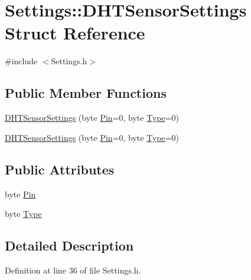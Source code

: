 \hypertarget{struct_settings_1_1_d_h_t_sensor_settings}{}\section{Settings\+:\+:D\+H\+T\+Sensor\+Settings Struct Reference}
\label{struct_settings_1_1_d_h_t_sensor_settings}


{\ttfamily \#include $<$Settings.\+h$>$}

\subsection*{Public Member Functions}
\begin{DoxyCompactItemize}
\item 
\hyperlink{struct_settings_1_1_d_h_t_sensor_settings_a9a3d8febe76e4cc665a25b3c7b5c847f}{D\+H\+T\+Sensor\+Settings} (byte \hyperlink{struct_settings_1_1_d_h_t_sensor_settings_a7ddbf39f8aa365c0282e4391219473be}{Pin}=0, byte \hyperlink{struct_settings_1_1_d_h_t_sensor_settings_af7ba74c5a9f4875c6e2154e631d67ea8}{Type}=0)
\item 
\hyperlink{struct_settings_1_1_d_h_t_sensor_settings_a9a3d8febe76e4cc665a25b3c7b5c847f}{D\+H\+T\+Sensor\+Settings} (byte \hyperlink{struct_settings_1_1_d_h_t_sensor_settings_a7ddbf39f8aa365c0282e4391219473be}{Pin}=0, byte \hyperlink{struct_settings_1_1_d_h_t_sensor_settings_af7ba74c5a9f4875c6e2154e631d67ea8}{Type}=0)
\end{DoxyCompactItemize}
\subsection*{Public Attributes}
\begin{DoxyCompactItemize}
\item 
byte \hyperlink{struct_settings_1_1_d_h_t_sensor_settings_a7ddbf39f8aa365c0282e4391219473be}{Pin}
\item 
byte \hyperlink{struct_settings_1_1_d_h_t_sensor_settings_af7ba74c5a9f4875c6e2154e631d67ea8}{Type}
\end{DoxyCompactItemize}


\subsection{Detailed Description}


Definition at line 36 of file Settings.\+h.



